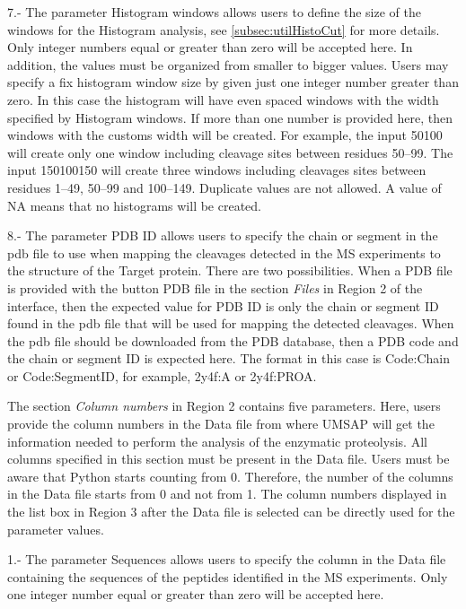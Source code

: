\num{7}.- The parameter Histogram windows\label{par:tarprotHist} allows users to define the size of the windows for the Histogram analysis, see \autoref{subsec:utilHistoCut} for more details. Only integer numbers equal or greater than zero will be accepted here. In addition, the values must be organized from smaller to bigger values. Users may specify a fix histogram window size by given just one integer number greater than zero. In this case the histogram will have even spaced windows with the width specified by Histogram windows. If more than one number is provided here, then windows with the customs width will be created. For example, the input \numlist{50 100} will create only one window including cleavage sites between residues \numrange{50}{99}. The input \numlist{1 50 100 150} will create three windows including cleavages sites between residues \numrange{1}{49}, \numrange{50}{99} and \numrange{100}{149}. Duplicate values are not allowed. A value of NA means that no histograms will be created.

\num{8}.- The parameter PDB ID\label{par:tarprotPdbID} allows users to specify the chain or segment in the pdb file to use when mapping the cleavages detected in the MS experiments to the structure of the Target protein. There are two possibilities. When a PDB file is provided with the button PDB file in the section \textit{Files} in Region \num{2} of the interface, then the expected value for PDB ID is only the chain or segment ID found in the pdb file that will be used for mapping the detected cleavages. When the pdb file should be downloaded from the PDB database, then a PDB code and the chain or segment ID is expected here. The format in this case is Code:Chain or Code:SegmentID, for example, 2y4f:A or 2y4f:PROA. 

The section \textit{Column numbers} in Region \num{2} contains five parameters. Here, users provide the column numbers in the Data file from where UMSAP will get the information needed to perform the analysis of the enzymatic proteolysis. All columns specified  in this section must be present in the Data file. Users must be aware that Python starts counting from \num{0}. Therefore, the number of the columns in the Data file starts from \num{0} and not from \num{1}. The column numbers displayed in the list box in Region \num{3} after the Data file is selected can be directly used for the parameter values.  

\num{1}.- The parameter Sequences allows users to specify the column in the Data file containing the sequences of the peptides identified in the MS experiments. Only one integer number equal or greater than zero will be accepted here.

